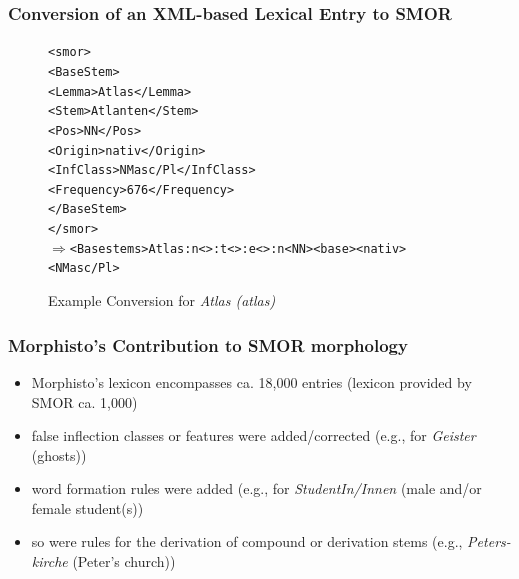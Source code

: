 \documentclass {beamer}
\begin{document}
\frame
{ \frametitle{Conversion of an XML-based Lexical Entry to SMOR}

\begin{figure}
\begin{alltt}
<smor>\\
\hspace{1cm}<BaseStem>\\
\hspace{2cm}<Lemma>Atlas</Lemma>\\ 
\hspace{2cm}<Stem>Atlanten</Stem>\\
\hspace{2cm}<Pos>NN</Pos>\\
\hspace{2cm}<Origin>nativ</Origin>\\
\hspace{2cm}<InfClass>NMasc/Pl</InfClass>\\
\hspace{2cm}<Frequency>676</Frequency>\\
\hspace{1cm}</BaseStem>\\
</smor>\\
$\Rightarrow$<Basestems>Atlas:n<>:t<>:e<>:n<NN><base><nativ><NMasc/Pl>
\end{alltt}  

\caption{Example Conversion for \emph{Atlas (atlas)} }
\end{figure}
}


\frame
{ \frametitle{Morphisto's Contribution to SMOR morphology}
\begin{itemize} 
\item Morphisto's lexicon encompasses ca. 18,000 entries (lexicon provided by SMOR ca. 1,000)
\item false inflection classes or features were added/corrected (e.g., for \emph{Geister} (ghosts)) 
\item word formation rules were added (e.g., for \emph{StudentIn/Innen} (male and/or female student(s))
\item so were rules for the derivation of compound or derivation stems (e.g., \emph{Peters-kirche} (Peter's church))
\end{itemize}
}
\end{document}

